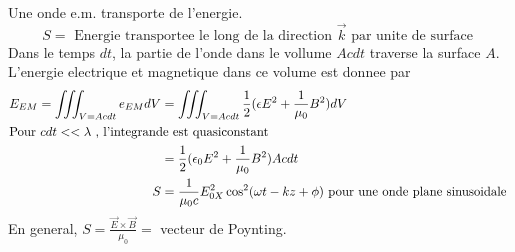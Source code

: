 \documentclass[../main.tex]{subfiles}
\begin{document}
Une onde e.m. transporte de l'energie.\\
\[ 
S= \text{ Energie transportee le long de la direction $\vec{k}$ par unite de surface } 
\]
Dans le temps $dt$, la partie de l'onde dans le vollume $Ac dt$ traverse la surface $A$.\\
L'energie electrique et magnetique dans ce volume est donnee par
\begin{align*}
	E_{EM} = \iiint_{V=Ac dt} e_{EM} dV &= \iiint_{V= Ac dt} \frac{1}{2}( \epsilon E^{2}+ \frac{1}{\mu_0}B^{2}) dV\\
	\intertext{Pour $c dt << \lambda$ , l'integrande est quasiconstant}
					    &= \frac{1}{2}( \epsilon_0 E^{2} + \frac{1}{\mu_0}B^{2}) Ac dt\\
	S &= \frac{1}{\mu_0 c}E_{0X} ^{2}\cos^{2}( \omega t - kz + \phi) \text{ pour une onde plane sinusoidale } 
\end{align*}
En general,
$S = \frac{\vec{E}\times \vec{B}}{\mu_0}=$ vecteur de Poynting.	
\end{document}
